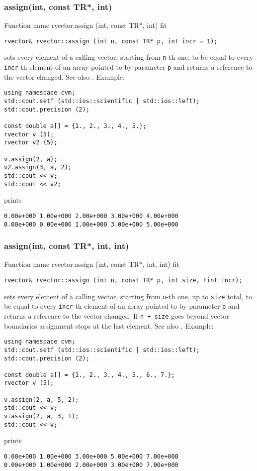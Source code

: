 \subsubsection{assign(int, const TR*, int)}
Function%
\pdfdest name {rvector.assign (int, const TR*, int)} fit
\begin{verbatim}
rvector& rvector::assign (int n, const TR* p, int incr = 1);
\end{verbatim}
sets every element of a calling vector, starting from \Based \verb"n"-th one,
to be equal to
every \verb"incr"-th element of an array  pointed to by parameter \verb"p"
and returns a reference to the vector changed.
See also .
Example:
\begin{Verbatim}
using namespace cvm;
std::cout.setf (std::ios::scientific | std::ios::left);
std::cout.precision (2);

const double a[] = {1., 2., 3., 4., 5.};
rvector v (5);
rvector v2 (5);

v.assign(2, a);
v2.assign(3, a, 2);
std::cout << v;
std::cout << v2;
\end{Verbatim}
prints
\begin{Verbatim}
0.00e+000 1.00e+000 2.00e+000 3.00e+000 4.00e+000
0.00e+000 0.00e+000 1.00e+000 3.00e+000 5.00e+000
\end{Verbatim}
\newpage


\subsubsection{assign(int, const TR*, int, int)}
Function%
\pdfdest name {rvector.assign (int, const TR*, int, int)} fit
\begin{verbatim}
rvector& rvector::assign (int n, const TR* p, int size, tint incr);
\end{verbatim}
sets every element of a calling vector, starting from \Based \verb"n"-th one,
up to \verb"size" total,
to be equal to
every \verb"incr"-th element of an array  pointed to by parameter \verb"p"
and returns a reference to the vector changed.
If \verb"n + size" goes beyond vector boundaries assignment stops at the last element.
See also .
Example:
\begin{Verbatim}
using namespace cvm;
std::cout.setf (std::ios::scientific | std::ios::left);
std::cout.precision (2);

const double a[] = {1., 2., 3., 4., 5., 6., 7.};
rvector v (5);

v.assign(2, a, 5, 2);
std::cout << v;
v.assign(2, a, 3, 1);
std::cout << v;
\end{Verbatim}
prints
\begin{Verbatim}
0.00e+000 1.00e+000 3.00e+000 5.00e+000 7.00e+000
0.00e+000 1.00e+000 2.00e+000 3.00e+000 7.00e+000
\end{Verbatim}
\newpage





